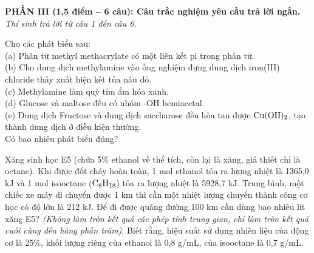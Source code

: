 \documentclass[11pt,a4paper]{article}
\begin{document}
\vspace{6pt}
\noindent
\textbf{\color{mainGreen}PHẦN III (1,5 điểm -- 6 câu): Câu trắc nghiệm yêu cầu trả lời ngắn.}\\
\textit{Thí sinh trả lời từ câu 1 đến câu 6.}

\setcounter{ex}{0}

\begin{ex}
Cho các phát biểu sau:\\
(a) Phân tử methyl methacrylate có một liên kết pi trong phân tử.\\
(b) Cho dung dịch methylamine vào ống nghiệm đựng dung dịch iron(III) chloride thấy xuất hiện kết tủa nâu đỏ.\\
(c) Methylamine làm quỳ tím ẩm hóa xanh.\\
(d) Glucose và maltose đều có nhóm -OH hemiacetal.\\
(e) Dung dịch Fructose và dung dịch saccharose đều hòa tan được $\ce{Cu(OH)2}$, tạo thành dung dịch ở điều kiện thường.\\
Có bao nhiêu phát biểu đúng?
\end{ex}

\begin{ex}
Xăng sinh học E5 (chứa 5\% ethanol về thể tích, còn lại là xăng, giả thiết chỉ là octane). Khi được đốt cháy hoàn toàn, 1 mol ethanol tỏa ra lượng nhiệt là 1365,0 kJ và 1 mol isooctane ($\ce{C8H18}$) tỏa ra lượng nhiệt là 5928,7 kJ. Trung bình, một chiếc xe máy di chuyển được 1 km thì cần một nhiệt lượng chuyển thành công cơ học có độ lớn là 212 kJ. Để đi được quãng đường 100 km cần dùng bao nhiêu lít xăng E5? \textit{(Không làm tròn kết quả các phép tính trung gian, chỉ làm tròn kết quả cuối cùng đến hàng phần trăm)}. Biết rằng, hiệu suất sử dụng nhiên liệu của động cơ là 25\%, khối lượng riêng của ethanol là 0,8 g/mL, của isooctane là 0,7 g/mL.
\end{ex}
\end{document}
